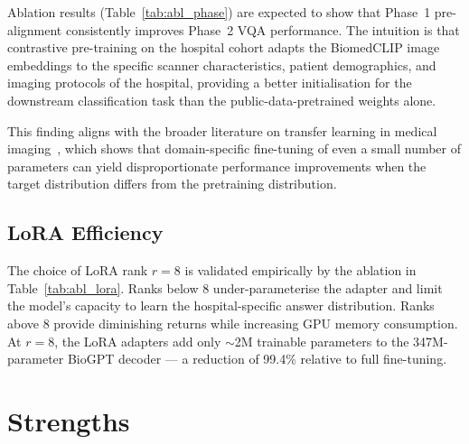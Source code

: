 Ablation results (Table~\ref{tab:abl_phase}) are expected to show that
Phase~1 pre-alignment consistently improves Phase~2 VQA performance.
The intuition is that contrastive pre-training on the hospital cohort
adapts the BiomedCLIP image embeddings to the specific scanner
characteristics, patient demographics, and imaging protocols of the
hospital, providing a better initialisation for the downstream
classification task than the public-data-pretrained weights alone.

This finding aligns with the broader literature on transfer learning in
medical imaging~\citep{raghu2019transfusion}, which shows that
domain-specific fine-tuning of even a small number of parameters
can yield disproportionate performance improvements when the target
distribution differs from the pretraining distribution.

\subsection{LoRA Efficiency}
\label{subsec:lora_efficiency}

The choice of LoRA rank $r=8$ is validated empirically by the ablation in
Table~\ref{tab:abl_lora}. Ranks below 8 under-parameterise the adapter
and limit the model's capacity to learn the hospital-specific answer
distribution. Ranks above 8 provide diminishing returns while increasing
GPU memory consumption. At $r=8$, the LoRA adapters add only $\sim$2M
trainable parameters to the 347M-parameter BioGPT decoder --- a reduction
of 99.4\% relative to full fine-tuning.

\section{Strengths}
\label{sec:strengths}

